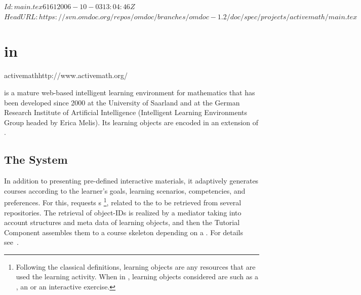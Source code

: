 \svnInfo $Id: main.tex 6161 2006-10-03 13:04:46Z  $
\svnKeyword $HeadURL: https://svn.omdoc.org/repos/omdoc/branches/omdoc-1.2/doc/spec/projects/activemath/main.tex $

\section[ActiveMath]{{\omdoc} in {\activemath}}
\begin{project}{activemath}{http://www.activemath.org/}
\end{project}


{\activemath} is a mature web-based intelligent learning environment for mathematics that
has been developed since 2000 at the University of Saarland and at the German Research
Institute of Artificial Intelligence (Intelligent Learning Environments Group headed by
Erica Melis). Its learning objects are encoded in an extension of {\omdoc}.

\subsection{The {\activemath} System}

In addition to presenting pre-defined interactive materials, it adaptively generates
courses according to the learner's goals, learning scenarios, competencies, and
preferences. For this, {} requests
{s} \footnote{Following the classical definitions, learning
  objects are any resources that are used the learning activity. When in {\omdoc},
  learning objects considered are such as a , an  or
  an interactive exercise.}, related to the {} to be retrieved
from several repositories.  The retrieval of object-IDs is realized by a mediator taking
into account structures and meta data of learning objects, and then the Tutorial Component
assembles them to a course skeleton depending on a {}.  For
details
see~\cite{Ullrich-TutorialPlanningYRT-AIED-2005,Ullrich-InstructionalOntology-ISWC-2004}.

